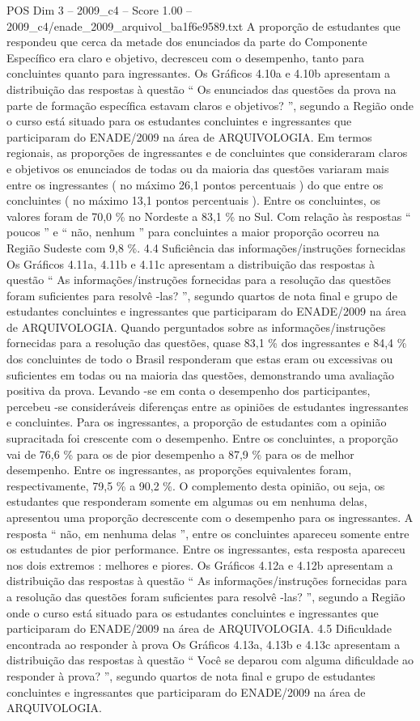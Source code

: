 \begin{textsample}{POS Dim 3 – 2009\_c4 – Score 1.00 – 2009\_c4/enade\_2009\_arquivol\_ba1f6e9589.txt}
A proporção de estudantes que respondeu que cerca da metade dos enunciados da parte do Componente Específico era claro e objetivo, decresceu com o desempenho, tanto para concluintes quanto para ingressantes.
Os Gráficos 4.10a e 4.10b apresentam a distribuição das respostas à questão “ Os enunciados das questões da prova na parte de formação específica estavam claros e objetivos? ”, segundo a Região onde o curso está situado para os estudantes concluintes e ingressantes que participaram do ENADE/2009 na área de ARQUIVOLOGIA.
Em termos regionais, as proporções de ingressantes e de concluintes que consideraram claros e objetivos os enunciados de todas ou da maioria das questões variaram mais entre os ingressantes ( no máximo 26,1 pontos percentuais ) do que entre os concluintes ( no máximo 13,1 pontos percentuais ).
Entre os concluintes, os valores foram de 70,0 \% no Nordeste a 83,1 \% no Sul.
Com relação às respostas “ poucos ” e “ não, nenhum ” para concluintes a maior proporção ocorreu na Região Sudeste com 9,8 \%. 4.4 Suficiência das informações/instruções fornecidas Os Gráficos 4.11a, 4.11b e 4.11c apresentam a distribuição das respostas à questão “ As informações/instruções fornecidas para a resolução das questões foram suficientes para resolvê -las? ”, segundo quartos de nota final e grupo de estudantes concluintes e ingressantes que participaram do ENADE/2009 na área de ARQUIVOLOGIA.
Quando perguntados sobre as informações/instruções fornecidas para a resolução das questões, quase 83,1 \% dos ingressantes e 84,4 \% dos concluintes de todo o Brasil responderam que estas eram ou excessivas ou suficientes em todas ou na maioria das questões, demonstrando uma avaliação positiva da prova.
Levando -se em conta o desempenho dos participantes, percebeu -se consideráveis diferenças entre as opiniões de estudantes ingressantes e concluintes.
Para os ingressantes, a proporção de estudantes com a opinião supracitada foi crescente com o desempenho.
Entre os concluintes, a proporção vai de 76,6 \% para os de pior desempenho a 87,9 \% para os de melhor desempenho.
Entre os ingressantes, as proporções equivalentes foram, respectivamente, 79,5 \% a 90,2 \%.
O complemento desta opinião, ou seja, os estudantes que responderam somente em algumas ou em nenhuma delas, apresentou uma proporção decrescente com o desempenho para os ingressantes.
A resposta “ não, em nenhuma delas ”, entre os concluintes apareceu somente entre os estudantes de pior performance.
Entre os ingressantes, esta resposta apareceu nos dois extremos : melhores e piores.
Os Gráficos 4.12a e 4.12b apresentam a distribuição das respostas à questão “ As informações/instruções fornecidas para a resolução das questões foram suficientes para resolvê -las? ”, segundo a Região onde o curso está situado para os estudantes concluintes e ingressantes que participaram do ENADE/2009 na área de ARQUIVOLOGIA. 4.5 Dificuldade encontrada ao responder à prova Os Gráficos 4.13a, 4.13b e 4.13c apresentam a distribuição das respostas à questão “ Você se deparou com alguma dificuldade ao responder à prova? ”, segundo quartos de nota final e grupo de estudantes concluintes e ingressantes que participaram do ENADE/2009 na área de ARQUIVOLOGIA.

\end{textsample}

